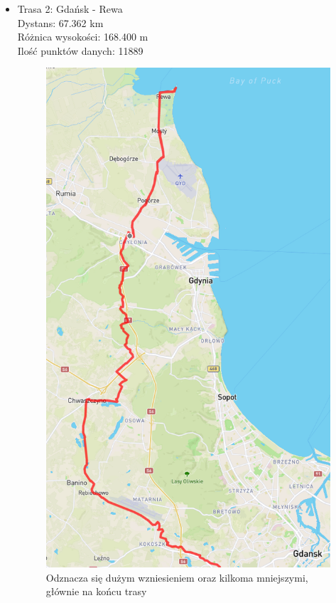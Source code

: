 \documentclass{article}
\begin{document}
\begin{multicols}{2}
    \begin{itemize}
        \item Trasa 2: Gdańsk - Rewa \\
        Dystans: 67.362 km \\
        Różnica wysokości: 168.400 m \\
        Ilość punktów danych: 11889
        \begin{figure}[H]
            \centering
            \captionsetup{justification=centering, width=0.8\linewidth}
            \includegraphics[height=0.35\textheight]{routes/rewa.png}
            \caption*{Odznacza się dużym wzniesieniem oraz kilkoma mniejszymi,
            głównie na końcu trasy}
        \end{figure}


\end{itemize}
\end{multicols}
\end{document}
